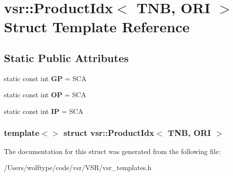 \hypertarget{structvsr_1_1_product_idx_3_01_t_n_b_00_01_o_r_i_01_4}{\section{vsr\-:\-:Product\-Idx$<$ T\-N\-B, O\-R\-I $>$ Struct Template Reference}
\label{structvsr_1_1_product_idx_3_01_t_n_b_00_01_o_r_i_01_4}
}
\subsection*{Static Public Attributes}
\begin{DoxyCompactItemize}
\item 
\hypertarget{structvsr_1_1_product_idx_3_01_t_n_b_00_01_o_r_i_01_4_a935d1b3143803bfbcb1ed1e1827332ba}{static const int {\bfseries G\-P} = S\-C\-A}\label{structvsr_1_1_product_idx_3_01_t_n_b_00_01_o_r_i_01_4_a935d1b3143803bfbcb1ed1e1827332ba}

\item 
\hypertarget{structvsr_1_1_product_idx_3_01_t_n_b_00_01_o_r_i_01_4_aeeff7d93f6dec8b979b9986a24ef77bf}{static const int {\bfseries O\-P} = S\-C\-A}\label{structvsr_1_1_product_idx_3_01_t_n_b_00_01_o_r_i_01_4_aeeff7d93f6dec8b979b9986a24ef77bf}

\item 
\hypertarget{structvsr_1_1_product_idx_3_01_t_n_b_00_01_o_r_i_01_4_a8a9abb431965c2d564cdba764451430e}{static const int {\bfseries I\-P} = S\-C\-A}\label{structvsr_1_1_product_idx_3_01_t_n_b_00_01_o_r_i_01_4_a8a9abb431965c2d564cdba764451430e}

\end{DoxyCompactItemize}
\subsubsection*{template$<$$>$ struct vsr\-::\-Product\-Idx$<$ T\-N\-B, O\-R\-I $>$}



The documentation for this struct was generated from the following file\-:\begin{DoxyCompactItemize}
\item 
/\-Users/wolftype/code/vsr/\-V\-S\-R/vsr\-\_\-templates.\-h\end{DoxyCompactItemize}
